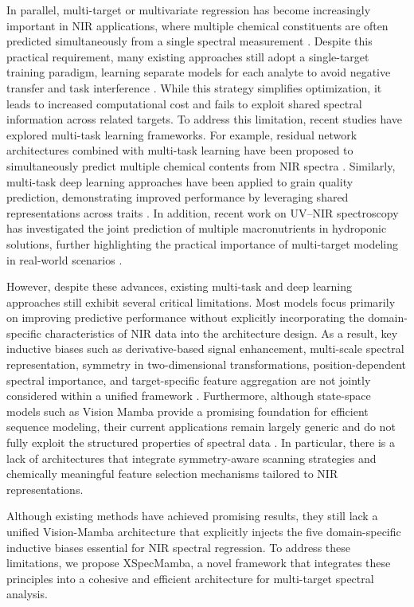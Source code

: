 \documentclass[pdflatex,sn-mathphys-num]{sn-jnl}%
\begin{document}
In parallel, multi-target or multivariate regression has become increasingly important in NIR applications, where multiple chemical constituents are often predicted simultaneously from a single spectral measurement \cite{MISHRA2022111741,zhang2022review}. Despite this practical requirement, many existing approaches still adopt a single-target training paradigm, learning separate models for each analyte to avoid negative transfer and task interference \cite{junior2020multi,liu2025multi}. While this strategy simplifies optimization, it leads to increased computational cost and fails to exploit shared spectral information across related targets. To address this limitation, recent studies have explored multi-task learning frameworks. For example, residual network architectures combined with multi-task learning have been proposed to simultaneously predict multiple chemical contents from NIR spectra \cite{pan2025residual}. Similarly, multi-task deep learning approaches have been applied to grain quality prediction, demonstrating improved performance by leveraging shared representations across traits \cite{assadzadeh2020multi}. In addition, recent work on UV–NIR spectroscopy has investigated the joint prediction of multiple macronutrients in hydroponic solutions, further highlighting the practical importance of multi-target modeling in real-world scenarios \cite{qi2024assessing}.

However, despite these advances, existing multi-task and deep learning approaches still exhibit several critical limitations. Most models focus primarily on improving predictive performance without explicitly incorporating the domain-specific characteristics of NIR data into the architecture design. As a result, key inductive biases such as derivative-based signal enhancement, multi-scale spectral representation, symmetry in two-dimensional transformations, position-dependent spectral importance, and target-specific feature aggregation are not jointly considered within a unified framework \cite{mishra2022deep,zhang2022review}. Furthermore, although state-space models such as Vision Mamba provide a promising foundation for efficient sequence modeling, their current applications remain largely generic and do not fully exploit the structured properties of spectral data \cite{liao2025specspatmamba,chen2026spatial}. In particular, there is a lack of architectures that integrate symmetry-aware scanning strategies and chemically meaningful feature selection mechanisms tailored to NIR representations.

Although existing methods have achieved promising results, they still lack a unified Vision-Mamba architecture that explicitly injects the five domain-specific inductive biases essential for NIR spectral regression. To address these limitations, we propose XSpecMamba, a novel framework that integrates these principles into a cohesive and efficient architecture for multi-target spectral analysis.
\end{document}
